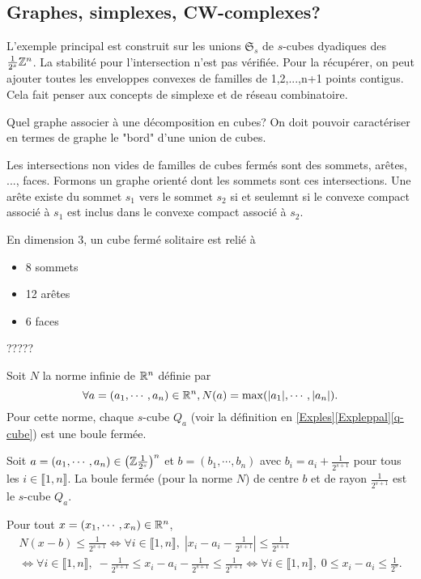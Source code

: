 \subsection{Graphes, simplexes, CW-complexes?}
L'exemple principal est construit sur les unions $\mathfrak{S}_s$ de $s$-cubes dyadiques des $\frac{1}{2^s}\mathbb{Z}^n$. La stabilité pour l'intersection n'est pas vérifiée. Pour la récupérer, on peut ajouter toutes les enveloppes convexes de familles de 1,2,...,n+1 points contigus. Cela fait penser aux concepts de simplexe et de réseau combinatoire.

Quel graphe associer à une décomposition en cubes?
On doit pouvoir caractériser en termes de graphe le "bord" d'une union de cubes.

Les intersections non vides de familles de cubes fermés sont des sommets, arêtes, ..., faces. Formons un graphe orienté dont les sommets sont ces intersections. Une arête existe du sommet $s_1$ vers le sommet $s_2$ si et seulemnt si le convexe compact associé à $s_1$ est inclus dans le convexe compact associé à $s_2$.

En dimension 3, un cube fermé solitaire est relié à
\begin{itemize}
 \item 8 sommets
 \item 12 arêtes
 \item 6 faces
\end{itemize}
?????

Soit $N$ la norme infinie de $\mathbb{R}^n$ définie par
\begin{displaymath}
 \forall a =(a_1, \cdots, a_n) \in \mathbb{R}^n, N(a) = \max(|a_1|, \cdots ,|a_n|).
\end{displaymath}
Pour cette norme, chaque $s$-cube $Q_a$ (voir la définition en \ref{Exples}\ref{Expleppal}\ref{q-cube}) est une boule fermée.
\begin{propn}
Soit $a =(a_1, \cdots, a_n) \in \left(\mathbb{Z}\frac{1}{2^s}\right)^n$ et $b=(b_1,\cdots,b_n)$ avec $b_i = a_i + \frac{1}{2^{s+1}}$ pour tous les $i\in \llbracket 1,n\rrbracket$.\newline
La boule fermée (pour la norme $N$) de centre $b$ et de rayon $\frac{1}{2^{s+1}}$ est le $s$-cube $Q_a$.
\end{propn}
\begin{demo}
 Pour tout $x =(x_1, \cdots, x_n) \in \mathbb{R}^n$,
\begin{multline*}
 N(x-b)\leq \frac{1}{2^{s+1}}
 \Leftrightarrow
 \forall i \in \llbracket 1, n\rrbracket, \; \left|x_i - a_i - \frac{1}{2^{s+1}} \right| \leq \frac{1}{2^{s+1}} \\
 \Leftrightarrow
 \forall i \in \llbracket 1, n\rrbracket, \; -\frac{1}{2^{s+1}} \leq x_i - a_i - \frac{1}{2^{s+1}} \leq \frac{1}{2^{s+1}}
 \Leftrightarrow
 \forall i \in \llbracket 1, n\rrbracket, \; 0 \leq x_i - a_i \leq \frac{1}{2^{s}}.
\end{multline*}
\end{demo}


